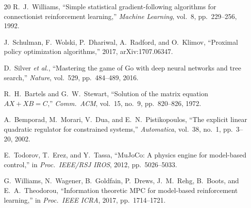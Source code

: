 \documentclass[letterpaper, 10pt, conference]{IEEEtran}
\begin{document}
\begin{thebibliography}{20}
R.~J.~Williams,
``Simple statistical gradient-following algorithms for
connectionist reinforcement learning,''
\emph{Machine Learning}, vol.~8, pp.~229--256, 1992.

J.~Schulman, F.~Wolski, P.~Dhariwal, A.~Radford, and O.~Klimov,
``Proximal policy optimization algorithms,''
2017, arXiv:1707.06347.

D.~Silver \emph{et al.},
``Mastering the game of Go with deep neural networks and tree search,''
\emph{Nature}, vol.~529, pp.~484--489, 2016.

R.~H.~Bartels and G.~W.~Stewart,
``Solution of the matrix equation $AX + XB = C$,''
\emph{Comm.\ ACM}, vol.~15, no.~9, pp.~820--826, 1972.

A.~Bemporad, M.~Morari, V.~Dua, and E.~N.~Pistikopoulos,
``The explicit linear quadratic regulator for constrained systems,''
\emph{Automatica}, vol.~38, no.~1, pp.~3--20, 2002.

E.~Todorov, T.~Erez, and Y.~Tassa,
``MuJoCo: A physics engine for model-based control,''
in \emph{Proc.\ IEEE/RSJ IROS}, 2012, pp.~5026--5033.

G.~Williams, N.~Wagener, B.~Goldfain, P.~Drews, J.~M.~Rehg,
B.~Boots, and E.~A.~Theodorou,
``Information theoretic MPC for model-based reinforcement learning,''
in \emph{Proc.\ IEEE ICRA}, 2017, pp.~1714--1721.

\end{thebibliography}
\end{document}
